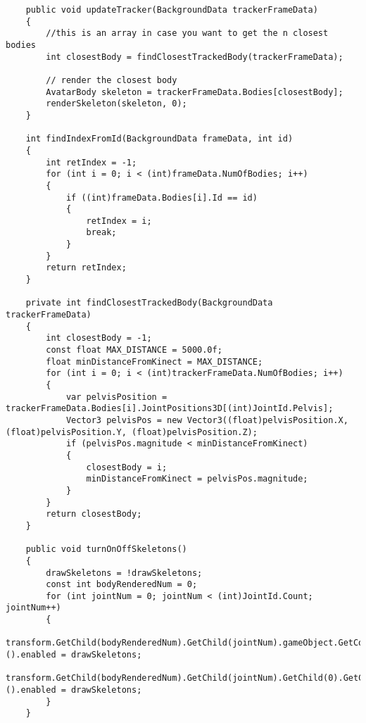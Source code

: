 \begin{verbatim}
    public void updateTracker(BackgroundData trackerFrameData)
    {
        //this is an array in case you want to get the n closest bodies
        int closestBody = findClosestTrackedBody(trackerFrameData);

        // render the closest body
        AvatarBody skeleton = trackerFrameData.Bodies[closestBody];
        renderSkeleton(skeleton, 0);
    }

    int findIndexFromId(BackgroundData frameData, int id)
    {
        int retIndex = -1;
        for (int i = 0; i < (int)frameData.NumOfBodies; i++)
        {
            if ((int)frameData.Bodies[i].Id == id)
            {
                retIndex = i;
                break;
            }
        }
        return retIndex;
    }

    private int findClosestTrackedBody(BackgroundData trackerFrameData)
    {
        int closestBody = -1;
        const float MAX_DISTANCE = 5000.0f;
        float minDistanceFromKinect = MAX_DISTANCE;
        for (int i = 0; i < (int)trackerFrameData.NumOfBodies; i++)
        {
            var pelvisPosition = trackerFrameData.Bodies[i].JointPositions3D[(int)JointId.Pelvis];
            Vector3 pelvisPos = new Vector3((float)pelvisPosition.X, (float)pelvisPosition.Y, (float)pelvisPosition.Z);
            if (pelvisPos.magnitude < minDistanceFromKinect)
            {
                closestBody = i;
                minDistanceFromKinect = pelvisPos.magnitude;
            }
        }
        return closestBody;
    }

    public void turnOnOffSkeletons()
    {
        drawSkeletons = !drawSkeletons;
        const int bodyRenderedNum = 0;
        for (int jointNum = 0; jointNum < (int)JointId.Count; jointNum++)
        {
            transform.GetChild(bodyRenderedNum).GetChild(jointNum).gameObject.GetComponent<MeshRenderer>().enabled = drawSkeletons;
            transform.GetChild(bodyRenderedNum).GetChild(jointNum).GetChild(0).GetComponent<MeshRenderer>().enabled = drawSkeletons;
        }
    }


\end{verbatim}
